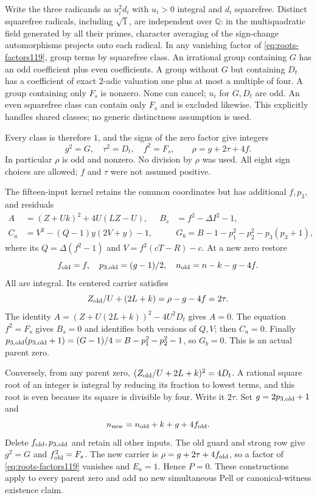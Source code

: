 Write the three radicands as $u_i^2d_i$ with $u_i>0$ integral and $d_i$
squarefree. Distinct squarefree radicals, including $\sqrt1$, are independent
over $\mathbb Q$: in the multiquadratic field generated by all their primes,
character averaging of the sign-change automorphisms projects onto each radical.
In any vanishing factor of \eqref{eq:roots-factors119}, group terms by squarefree
class. An irrational group containing $G$ has an odd coefficient plus even
coefficients. A group without $G$ but containing $D_t$ has a coefficient of
exact $2$-adic valuation one plus at most a multiple of four. A group containing
only $F_s$ is nonzero. None can cancel; $u_i$ for $G,D_t$ are odd. An even
squarefree class can contain only $F_s$ and is excluded likewise. This explicitly
handles shared classes; no generic distinctness assumption is used.

Every class is therefore $1$, and the signs of the zero factor give integers
\begin{equation}\label{eq:roots-integrals119}
 g^2=G,\quad\tau^2=D_t,\quad f^2=F_s,\qquad
 \rho=g+2\tau+4f.
\end{equation}
In particular $\rho$ is odd and nonzero. No division by $\rho$ was used.
All eight sign choices are allowed; $f$ and $\tau$ were not assumed positive.

The fifteen-input kernel retains the common coordinates but has additional
$f,p_3$, and residuals
\begin{align*}
 A&=(Z+Uk)^2+4U(LZ-U),& B_s&=f^2-\Delta I^2-1,\\
 C_a&=V^2-(Q-1)y(2V+y)-1,&&
 G_b=B-1-p_1^2-p_2^2-p_3(p_3+1),
\end{align*}
where its $Q=\Delta(f^2-1)$ and $V=f^2(cT-R)-c$.
At a new zero restore
\[
 f_{\rm old}=f,\quad p_{3,\rm old}=(g-1)/2,\quad
 n_{\rm old}=n-k-g-4f.
\]
All are integral. Its centered carrier satisfies
\[
 Z_{\rm old}/U+(2L+k)=\rho-g-4f=2\tau.
\]
The identity $A=(Z+U(2L+k))^2-4U^2D_t$ gives $A=0$.
The equation $f^2=F_s$ gives $B_s=0$ and identifies both versions of $Q,V$;
then $C_a=0$. Finally
$p_{3,\rm old}(p_{3,\rm old}+1)=(G-1)/4=B-p_1^2-p_2^2-1$, so $G_b=0$.
This is an actual parent zero.

Conversely, from any parent zero,
$(Z_{\rm old}/U+2L+k)^2=4D_t$. A rational square root of an integer is
integral by reducing its fraction to lowest terms, and this root is even
because its square is divisible by four. Write it $2\tau$. Set
$g=2p_{3,\rm old}+1$ and
\[
 n_{\rm new}=n_{\rm old}+k+g+4f_{\rm old}.
\]
Delete $f_{\rm old},p_{3,\rm old}$ and retain all other inputs. The old guard
and strong row give $g^2=G$ and $f_{\rm old}^2=F_s$. The new carrier is
$\rho=g+2\tau+4f_{\rm old}$, so a factor of \eqref{eq:roots-factors119}
vanishes and $E_a=1$. Hence $P=0$. These constructions apply to every parent
zero and add no new simultaneous Pell or canonical-witness existence claim.

